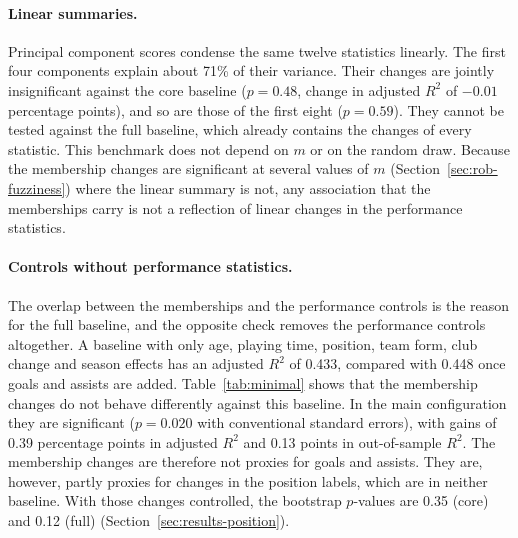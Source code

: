 \paragraph{Linear summaries.} Principal component scores condense the same twelve statistics linearly. The first four components explain about 71\% of their variance. Their changes are jointly insignificant against the core baseline ($p=0.48$, change in adjusted $R^2$ of $-0.01$ percentage points), and so are those of the first eight ($p=0.59$). They cannot be tested against the full baseline, which already contains the changes of every statistic. This benchmark does not depend on $m$ or on the random draw. Because the membership changes are significant at several values of $m$ (Section~\ref{sec:rob-fuzziness}) where the linear summary is not, any association that the memberships carry is not a reflection of linear changes in the performance statistics.

\paragraph{Controls without performance statistics.} The overlap between the memberships and the performance controls is the reason for the full baseline, and the opposite check removes the performance controls altogether. A baseline with only age, playing time, position, team form, club change and season effects has an adjusted $R^2$ of 0.433, compared with 0.448 once goals and assists are added. Table~\ref{tab:minimal} shows that the membership changes do not behave differently against this baseline. In the main configuration they are significant ($p=0.020$ with conventional standard errors), with gains of 0.39 percentage points in adjusted $R^2$ and 0.13 points in out-of-sample $R^2$. The membership changes are therefore not proxies for goals and assists. They are, however, partly proxies for changes in the position labels, which are in neither baseline. With those changes controlled, the bootstrap $p$-values are 0.35 (core) and 0.12 (full) (Section~\ref{sec:results-position}).


